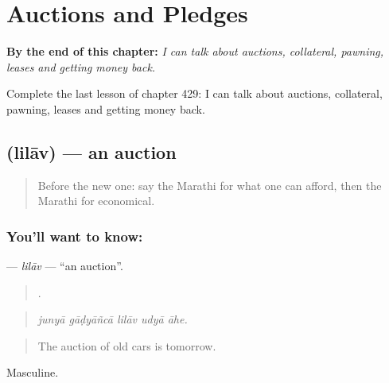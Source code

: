 
\chapter{Auctions and Pledges}
\label{ch:mr-auctions-and-pledges}

\begin{chapteropening}
\textbf{By the end of this chapter:} \emph{I can talk about auctions, collateral, pawning, leases and getting money back.}

Complete the last lesson of chapter 429: I can talk about auctions, collateral, pawning, leases and getting money back.
\end{chapteropening}

\section[\texorpdfstring{\mr{लिलाव} (lilāv)}{लिलाव (lilāv)}]{ (lilāv) — an auction}

\label{lesson:MR-C429-lilav}



\begin{quote}
Before the new one: say the Marathi for what one can afford, then the Marathi for economical.
\end{quote}

\subsection*{You'll want to know: }
\textbf{} — \emph{lilāv} — \textquotedblleft{}an auction\textquotedblright{}.

\begin{quote}
    .
\end{quote}

\begin{quote}
\emph{junyā gāḍyāñcā lilāv udyā āhe.}
\end{quote}

\begin{quote}
The auction of old cars is tomorrow.
\end{quote}

Masculine.

